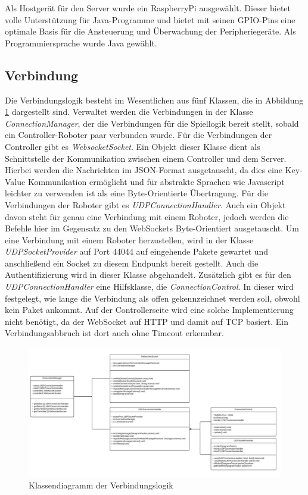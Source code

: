 Als Hostgerät für den Server wurde ein RaspberryPi ausgewählt. Dieser bietet volle Unterstützung für Java-Programme und bietet mit seinen GPIO-Pins eine optimale Basis für die Ansteuerung und Überwachung der Peripheriegeräte. 
Als Programmiersprache wurde Java gewählt.


\subsection{Verbindung}
Die Verbindungslogik besteht im Wesentlichen aus fünf Klassen, die in Abbildung \ref{fig:uml_verbindung} dargestellt sind. Verwaltet werden die Verbindungen in der Klasse \textit{ConnectionManager}, der die Verbindungen für die Spiellogik bereit stellt, sobald ein Controller-Roboter paar verbunden wurde. Für die Verbindungen der Controller gibt es \textit{WebsocketSocket}. Ein Objekt dieser Klasse dient als Schnittstelle der Kommunikation zwischen einem Controller und dem Server. Hierbei werden die Nachrichten im JSON-Format ausgetauscht, da dies eine Key-Value Kommunikation ermöglicht und für abstrakte Sprachen wie Javascript leichter zu verwenden ist als eine Byte-Orientierte Übertragung. Für die Verbindungen der Roboter gibt es \textit{UDPConnectionHandler}. Auch ein Objekt davon steht für genau eine Verbindung mit einem Roboter, jedoch werden die Befehle hier im Gegensatz zu den WebSockets Byte-Orientiert ausgetauscht. Um eine Verbindung mit einem Roboter herzustellen, wird in der Klasse \textit{UDPSocketProvider} auf Port 44044 auf eingehende Pakete gewartet und anschließend ein Socket zu diesem Endpunkt bereit gestellt. Auch die Authentifizierung wird in dieser Klasse abgehandelt. Zusätzlich gibt es für den \textit{UDPConnectionHandler} eine Hilfsklasse, die \textit{ConnectionControl}. In dieser wird festgelegt, wie lange die Verbindung als offen gekennzeichnet werden soll, obwohl kein Paket ankommt. Auf der Controllerseite wird eine solche Implementierung nicht benötigt, da der WebSocket auf HTTP und damit auf TCP basiert. Ein Verbindungsabbruch ist dort auch ohne Timeout erkennbar.


\begin{figure}[!h]
	\includegraphics[width=\textwidth]{images/uml_verbindung.pdf}
	\caption{Klassendiagramm der Verbindungslogik}
	\label{fig:uml_verbindung}
\end{figure}



